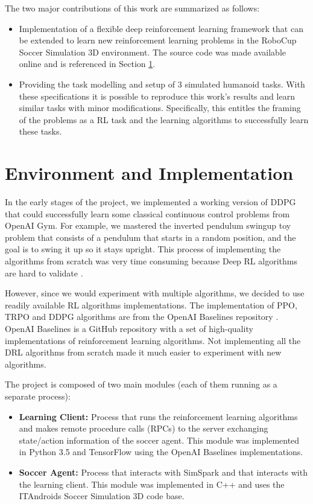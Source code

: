 The two major contributions of this work are summarized as follows:

\begin{itemize}
    \item Implementation of a flexible deep reinforcement learning framework that can be extended to learn new 
    reinforcement learning problems in the RoboCup Soccer Simulation 3D environment. The source code was made 
    available online and is referenced in Section \ref{sec:envandimpl}.
    \item Providing the task modelling and setup of 3 simulated humanoid tasks.
    With these specifications it is possible to reproduce this work's results and learn similar tasks with minor
    modifications. Specifically, this entitles the framing
    of the problems as a RL task and the learning algorithms to successfully learn these tasks.
\end{itemize}

\section{Environment and Implementation}
\label{sec:envandimpl}

In the early stages of the project, we implemented a working version of DDPG that could successfully learn some classical continuous control
problems from OpenAI Gym.
For example, we mastered the inverted pendulum swingup toy problem that consists of a pendulum that starts in a random position, 
and the goal is to swing it up so it stays upright.
This process of implementing the algorithms from scratch was very time consuming because Deep RL algorithms are hard to validate \cite{VerificationRL}.

However, since we would experiment with multiple algorithms, we decided to use readily available RL algorithms
implementations. The implementation of PPO, TRPO and DDPG algorithms are from the OpenAI Baselines repository \cite{OpenAIBaselines}. 
OpenAI Baselines is a GitHub repository with a set of high-quality implementations of reinforcement learning algorithms.
Not implementing all the DRL algorithms from scratch made it much easier to experiment with new algorithms. 

The project is composed of two main modules (each of them running as a separate process):
\begin{itemize}
    \item \textbf{Learning Client:} Process that runs the reinforcement learning algorithms and makes remote procedure calls (RPCs)
    to the server exchanging state/action information of the soccer agent. This module was implemented in Python 3.5 and TensorFlow using the
    OpenAI Baselines \cite{OpenAIBaselines} implementations.
    \item \textbf{Soccer Agent:} Process that interacts with SimSpark and that interacts with the learning client.
    This module was implemented in C++ and uses the ITAndroids Soccer Simulation 3D code base.
\end{itemize}

